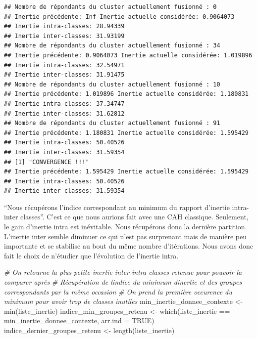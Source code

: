 \documentclass[
]{article}
\newenvironment{Shaded}{\begin{snugshade}}{\end{snugshade}}
\newcommand{\AttributeTok}[1]{\textcolor[rgb]{0.77,0.63,0.00}{#1}}
\newcommand{\CommentTok}[1]{\textcolor[rgb]{0.56,0.35,0.01}{\textit{#1}}}
\newcommand{\ConstantTok}[1]{\textcolor[rgb]{0.00,0.00,0.00}{#1}}
\newcommand{\FunctionTok}[1]{\textcolor[rgb]{0.00,0.00,0.00}{#1}}
\newcommand{\NormalTok}[1]{#1}
\newcommand{\OtherTok}[1]{\textcolor[rgb]{0.56,0.35,0.01}{#1}}
\newcommand{\SpecialCharTok}[1]{\textcolor[rgb]{0.00,0.00,0.00}{#1}}
\begin{document}
\begin{verbatim}
## Nombre de répondants du cluster actuellement fusionné : 0 
## Inertie précédente: Inf Inertie actuelle considérée: 0.9064073 
## Inertie intra-classes: 28.94339 
## Inertie inter-classes: 31.93199 
## Nombre de répondants du cluster actuellement fusionné : 34 
## Inertie précédente: 0.9064073 Inertie actuelle considérée: 1.019896 
## Inertie intra-classes: 32.54971 
## Inertie inter-classes: 31.91475 
## Nombre de répondants du cluster actuellement fusionné : 10 
## Inertie précédente: 1.019896 Inertie actuelle considérée: 1.180831 
## Inertie intra-classes: 37.34747 
## Inertie inter-classes: 31.62812 
## Nombre de répondants du cluster actuellement fusionné : 91 
## Inertie précédente: 1.180831 Inertie actuelle considérée: 1.595429 
## Inertie intra-classes: 50.40526 
## Inertie inter-classes: 31.59354 
## [1] "CONVERGENCE !!!"
## Inertie précédente: 1.595429 Inertie actuelle considérée: 1.595429 
## Inertie intra-classes: 50.40526 
## Inertie inter-classes: 31.59354
\end{verbatim}

``Nous récupérons l'indice correspondant au minimum du rapport d'inertie
intra-inter classes''. C'est ce que nous aurions fait avec une CAH
classique. Seulement, le gain d'inertie intra est inévitable. Nous
récupérons donc la dernière partition. L'inertie inter semble diminuer
ce qui n'est pas surprenant mais de manière peu importante et se
stabilise au bout du même nombre d'itérations. Nous avons donc fait le
choix de n'étudier que l'évolution de l'inertie intra.

\begin{Shaded}
\begin{Highlighting}[]
\CommentTok{\# On retourne la plus petite inertie inter{-}intra classes retenue pour pouvoir la comparer après}
\CommentTok{\# Récupération de l\textquotesingle{}indice du minimum d\textquotesingle{}inertie et des groupes correspondants par la même occasion}
\CommentTok{\# On prend la première occurence du minimum pour avoir trop de classes inutiles}
\NormalTok{min\_inertie\_donnee\_contexte }\OtherTok{\textless{}{-}} \FunctionTok{min}\NormalTok{(liste\_inertie)}
\NormalTok{indice\_min\_groupes\_retenu }\OtherTok{\textless{}{-}} \FunctionTok{which}\NormalTok{(liste\_inertie }\SpecialCharTok{==}\NormalTok{ min\_inertie\_donnee\_contexte, }\AttributeTok{arr.ind =} \ConstantTok{TRUE}\NormalTok{)}
\NormalTok{indice\_dernier\_groupes\_retenu }\OtherTok{\textless{}{-}} \FunctionTok{length}\NormalTok{(liste\_inertie)}
\end{Highlighting}
\end{Shaded}
\end{document}
